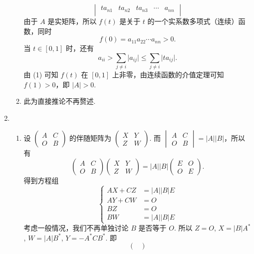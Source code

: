 \begin{enumerate}
\begin{enumerate}
\[\begin{vmatrix}
            ta_{n1} & ta_{n2} & ta_{n3} & \cdots & a_{nn} \\
        \end{vmatrix}\] 由于 $A$ 是实矩阵，所以 $f(t)$ 是关于 $t$ 的一个实系数多项式（连续）函数，同时 \[f(0) = a_{11}a_{22}\cdots a_{nn} > 0.\] 当 $t \in [0, 1]$ 时，还有 \[a_{ii} > \sum_{j \neq i} \lvert a_{ij} \rvert \leqslant \sum_{j \neq i} \lvert ta_{ij} \rvert.\] 由 (1) 可知 $f(t)$ 在 $[0, 1]$ 上非零，由连续函数的介值定理可知 $f(1) > 0$，即 $\lvert A \rvert > 0.$
        \item 此为直接推论不再赘述.
    \end{enumerate}
    \item \begin{enumerate}
        \item 设 $\begin{pmatrix}
            A & C \\
            O & B
        \end{pmatrix}$ 的伴随矩阵为 $\begin{pmatrix}
            X & Y \\
            Z & W
        \end{pmatrix}$. 而 $\begin{vmatrix}
            A & C \\
            O & B
        \end{vmatrix} = \lvert A\rvert \lvert B \rvert$，所以有 \[\begin{pmatrix}
            A & C \\
            O & B
        \end{pmatrix} \begin{pmatrix}
            X & Y \\
            Z & W
        \end{pmatrix} = \lvert A\rvert \lvert B \rvert \begin{pmatrix}
            E & O \\
            O & E
        \end{pmatrix}.\] 得到方程组 \[\begin{cases}
            AX+CZ & {}= \lvert A \rvert \lvert B \rvert E \\
            AY+CW & {}= O \\
            BZ & {}= O \\
            BW & {}= \lvert A \rvert \lvert B \rvert E
        \end{cases}\] 考虑一般情况，我们不再单独讨论 $B$ 是否等于 $O$. 所以 $Z = O$, $X = \lvert B \rvert A^*$, $W = \lvert A \rvert B^*$, $Y = -A^*CB^*$. 即 \[\begin{pmatrix}

\end{pmatrix}\]
\end{enumerate}
\end{enumerate}
